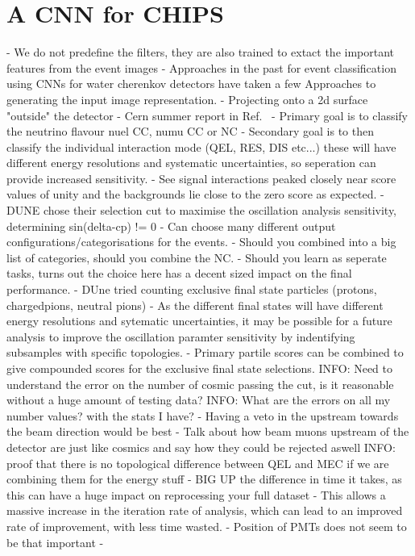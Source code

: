 \section{A CNN for CHIPS}
\label{sec:cvn_cnn_for_chips}
- We do not predefine the filters, they are also trained to extact the important features from the event images
- Approaches in the past for event classification using CNNs for water cherenkov detectors have taken a few Approaches to generating the input image representation.
- Projecting onto a 2d surface "outside" the detector
- Cern summer report in Ref.~\cite{theodore2016}
- Primary goal is to classify the neutrino flavour nuel CC, numu CC or NC
- Secondary goal is to then classify the individual interaction mode (QEL, RES, DIS etc...) these will have different energy resolutions and systematic uncertainties, so seperation can provide increased sensitivity.
- See signal interactions peaked closely near score values of unity and the backgrounds lie close to the zero score as expected.
- DUNE chose their selection cut to maximise the oscillation analysis sensitivity, determining sin(delta-cp) != 0
- Can choose many different output configurations/categorisations for the events.
- Should you combined into a big list of categories, should you combine the NC.
- Should you learn as seperate tasks, turns out the choice here has a decent sized impact on the final performance.
- DUne tried counting exclusive final state particles (protons, chargedpions, neutral pions)
- As the different final states will have different energy resolutions and sytematic uncertainties, it may be possible for a future analysis to improve the oscillation paramter sensitivity by indentifying subsamples with specific topologies.
- Primary partile scores can be combined to give compounded scores for the exclusive final state selections.
INFO: Need to understand the error on the number of cosmic passing the cut, is it reasonable without a huge amount of testing data?
INFO: What are the errors on all my number values? with the stats I have?
- Having a veto in the upstream towards the beam direction would be best
- Talk about how beam muons upstream of the detector are just like cosmics and say how they could be rejected aswell
INFO: proof that there is no topological difference between QEL and MEC if we are combining them for the energy stuff
- BIG UP the difference in time it takes, as this can have a huge impact on reprocessing your full dataset
- This allows a massive increase in the iteration rate of analysis, which can lead to an improved rate of improvement, with less time wasted.
- Position of PMTs does not seem to be that important
-

